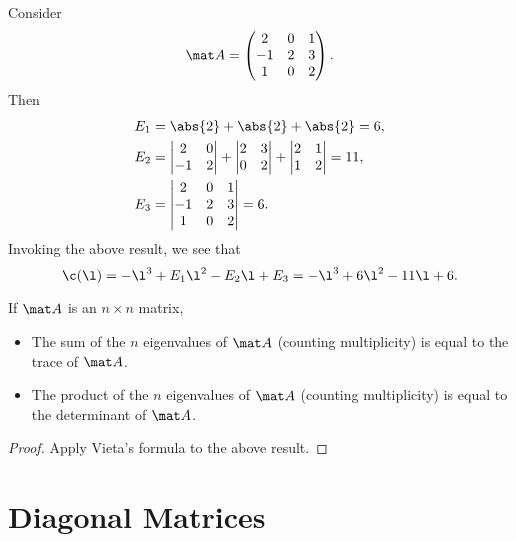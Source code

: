 \begin{example}
    Consider \[\mat A = \begin{pmatrix}2 & 0 & 1 \\ -1 & 2 & 3 \\ 1 & 0 & 2\end{pmatrix}.\] Then
    \begin{align*}
        E_1 &= \abs{2} + \abs{2} + \abs{2} = 6,\\
        E_2 &= \begin{vmatrix}2 & 0 \\ -1 & 2\end{vmatrix} + \begin{vmatrix}2 & 3 \\ 0 & 2\end{vmatrix} + \begin{vmatrix}2 & 1 \\ 1 & 2\end{vmatrix} = 11,\\
        E_3 &= \begin{vmatrix}2 & 0 & 1 \\ -1 & 2 & 3 \\ 1 & 0 & 2\end{vmatrix} = 6.
    \end{align*}
    Invoking the above result, we see that \[\c(\l) = -\l^3 + E_1 \l^2 - E_2 \l + E_3 = -\l^3 + 6 \l^2 - 11 \l + 6.\]
\end{example}

\begin{corollary}
    If $\mat A$ is an $n \times n$ matrix,
    \begin{itemize}
        \item The sum of the $n$ eigenvalues of $\mat A$ (counting multiplicity) is equal to the trace of $\mat A$.
        \item The product of the $n$ eigenvalues of $\mat A$ (counting multiplicity) is equal to the determinant of $\mat A$.
    \end{itemize}
\end{corollary}
\begin{proof}
    Apply Vieta's formula to the above result.
\end{proof}

\section{Diagonal Matrices}

